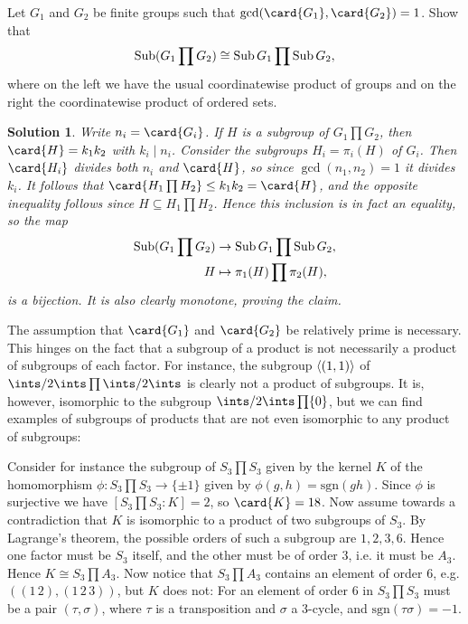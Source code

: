 \documentclass[article, a4paper, 11pt, oneside]{memoir}
\numberwithin{equation}{chapter}
\DeclarePairedDelimiter{\gen}{\langle}{\rangle} %
\renewenvironment{exerciseframed}[1][]{%
    \setsepchar{.}%
    \readlist*\mylist{#1}%
    \def\smalllabel{\mylist[2].\mylist[3]}%
    \refstepcounter{exerciseframed}%
    \begin{exerciseframed*}[#1]%
    \label{ex:#1}%
}{%
    \end{exerciseframed*}%
}
\theoremstyle{nonumberplain}
\newtheorem{solution}{Solution}
\begin{document}
\begin{exerciseframed}[2.31]
    Let $G_1$ and $G_2$ be finite groups such that $\gcd(\card{G_1}, \card{G_2}) = 1$. Show that
    \begin{equation*}
        \operatorname{Sub}(G_1 \prod G_2) \cong \operatorname{Sub} G_1 \prod \operatorname{Sub} G_2,
    \end{equation*}
    where on the left we have the usual coordinatewise product of groups and on the right the coordinatewise product of ordered sets.
\end{exerciseframed}

\begin{solution}
    Write $n_i = \card{G_i}$. If $H$ is a subgroup of $G_1 \prod G_2$, then $\card{H} = k_1 k_2$ with $k_i \mid n_i$. Consider the subgroups $H_i = \pi_i(H)$ of $G_i$. Then $\card{H_i}$ divides both $n_i$ and $\card{H}$, so since $\gcd(n_1,n_2) = 1$ it divides $k_i$. It follows that $\card{H_1 \prod H_2} \leq k_1 k_2 = \card{H}$, and the opposite inequality follows since $H \subseteq H_1 \prod H_2$. Hence this inclusion is in fact an equality, so the map
    \begin{align*}
        \operatorname{Sub}(G_1 \prod G_2) &\to \operatorname{Sub} G_1 \prod \operatorname{Sub} G_2, \\
        H &\mapsto \pi_1(H) \prod \pi_2(H),
    \end{align*}
    is a bijection. It is also clearly monotone, proving the claim.
\end{solution}

\newcommand{\sgn}{\mathrm{sgn}}

\begin{remark}
    The assumption that $\card{G_1}$ and $\card{G_2}$ be relatively prime is necessary. This hinges on the fact that a subgroup of a product is not necessarily a product of subgroups of each factor. For instance, the subgroup $\gen{(1,1)}$ of $\ints/2\ints \prod \ints/2\ints$ is clearly not a product of subgroups. It is, however, isomorphic to the subgroup $\ints/2\ints \prod \{0\}$, but we can find examples of subgroups of products that are not even isomorphic to any product of subgroups:

    Consider for instance the subgroup of $S_3 \prod S_3$ given by the kernel $K$ of the homomorphism $\phi \colon S_3 \prod S_3 \to \{\pm 1\}$ given by $\phi(g,h) = \sgn(gh)$. Since $\phi$ is surjective we have $[S_3 \prod S_3 : K] = 2$, so $\card{K} = 18$. Now assume towards a contradiction that $K$ is isomorphic to a product of two subgroups of $S_3$. By Lagrange's theorem, the possible orders of such a subgroup are $1,2,3,6$. Hence one factor must be $S_3$ itself, and the other must be of order $3$, i.e. it must be $A_3$. Hence $K \cong S_3 \prod A_3$. Now notice that $S_3 \prod A_3$ contains an element of order $6$, e.g. $((1\,2), (1\,2\,3))$, but $K$ does not: For an element of order $6$ in $S_3 \prod S_3$ must be a pair $(\tau,\sigma)$, where $\tau$ is a transposition and $\sigma$ a $3$-cycle, and $\sgn(\tau\sigma) = -1$.
\end{remark}
\end{document}
